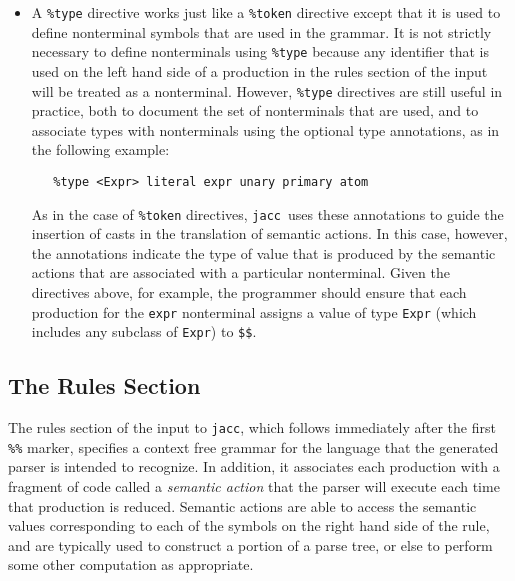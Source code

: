 \documentclass[12pt]{article}
\def\jacc{{\tt jacc}}
\begin{document}
\begin{itemize}
\item A \verb"%type" directive works just like a \verb"%token"
      directive except that it is used to define nonterminal symbols
      that are used in the grammar.  It is not strictly necessary to
      define nonterminals using \verb"%type" because any identifier
      that is used on the left hand side of a production in the
      rules section of the input will be treated as a nonterminal.
      However, \verb"%type" directives are still useful in practice,
      both to document the set of nonterminals that are used, and
      to associate types with nonterminals using the optional type
      annotations, as in the following example:
\begin{verbatim}
   %type <Expr> literal expr unary primary atom
\end{verbatim}
      As in the case of \verb"%token" directives, \jacc\ uses these
      annotations to guide the insertion of casts in the translation
      of semantic actions.  In this case, however, the annotations
      indicate the type of value that is produced by the semantic
      actions that are associated with a particular nonterminal.
      Given the directives above, for example, the programmer should
      ensure that each production for the \verb"expr" nonterminal
      assigns a value of type \verb"Expr" (which includes any subclass
      of \verb"Expr") to \verb"$"\verb"$".
\end{itemize}

\subsection{The Rules Section}
The rules section of the input to \jacc, which follows immediately
after the first \verb"%%" marker, specifies a context free grammar
for the language that the generated parser is intended to recognize.
In addition, it associates each production with a fragment of code
called a {\em semantic action} that the parser will execute each
time that production is reduced.  Semantic actions are able to
access the semantic values corresponding to each of the symbols
on the right hand side of the rule, and are typically used to
construct a portion of a parse tree, or else to perform some other
computation as appropriate.

\end{document}
